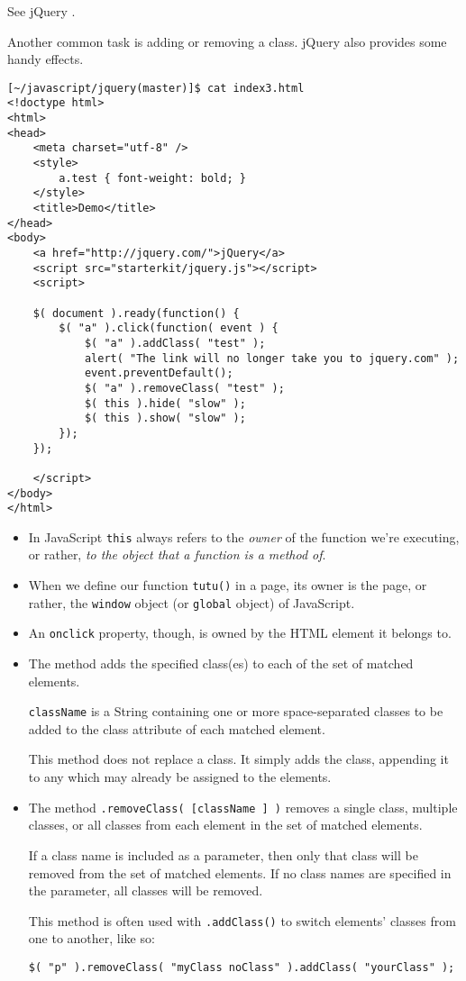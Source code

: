 See jQuery .

Another common task is adding or removing a class.
jQuery also provides some handy effects.

\begin{verbatim}
[~/javascript/jquery(master)]$ cat index3.html 
<!doctype html>
<html>
<head>
    <meta charset="utf-8" />
    <style>
        a.test { font-weight: bold; }
    </style>
    <title>Demo</title>
</head>
<body>
    <a href="http://jquery.com/">jQuery</a>
    <script src="starterkit/jquery.js"></script>
    <script>
 
    $( document ).ready(function() {
        $( "a" ).click(function( event ) {
            $( "a" ).addClass( "test" );
            alert( "The link will no longer take you to jquery.com" );
            event.preventDefault();
            $( "a" ).removeClass( "test" );
            $( this ).hide( "slow" );
            $( this ).show( "slow" );
        });
    });
 
    </script>
</body>
</html>
\end{verbatim}
\begin{itemize}
\item
In JavaScript \verb|this| always refers to the {\it owner} of the function
we're executing, or rather, {\it to the object that a function is a method of}.

\item
When we define our function \verb|tutu()| in a page, its owner is the
page, or rather, the \verb|window| object (or \verb|global| object) of JavaScript. 

\item
An \verb|onclick| property, though, is owned by the HTML element it belongs to.

\item
The method
adds the specified class(es) to each of the set of matched elements.

\verb|className| is a String containing 
one or more space-separated classes to be added to the class attribute of each matched element.

This method does not replace a class. It simply adds the class, appending
it to any which may already be assigned to the elements.
\item
The method \verb|.removeClass( [className ] )|
removes a single class, multiple classes, or all classes from each element in the set of matched elements.

If a class name is included as a parameter, then only that class will be
removed from the set of matched elements. If no class names are specified
in the parameter, all classes will be removed.

This method is often used with \verb|.addClass()| 
to switch elements' classes from one to another, like so:

\begin{verbatim}
$( "p" ).removeClass( "myClass noClass" ).addClass( "yourClass" );
\end{verbatim}

\end{itemize}





